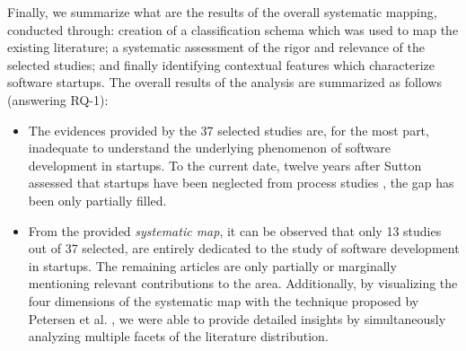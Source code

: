 \documentclass[final,5p,times,twocolumn]{elsarticle}
\begin{document}
Finally, we summarize what are the results of the overall systematic mapping, conducted through: creation of a classification schema which was used to map the existing literature; a systematic assessment of the rigor and relevance of the selected studies; and finally identifying contextual features which characterize software startups. The overall results of the analysis are summarized as follows (answering RQ-1):


\begin{itemize}

\item The evidences provided by the 37 selected studies are, for the most part, inadequate to understand the underlying phenomenon of software development in startups. To the current date, twelve years after Sutton assessed that startups have been neglected from process studies \cite{Sutton2000}, the gap has been only partially filled.
\item From the provided \textit{systematic map}, it can be observed that only 13 studies out of 37 selected, are entirely dedicated to the study of software development in startups. The remaining articles are only partially or marginally mentioning relevant contributions to the area. Additionally, by visualizing the four dimensions of the systematic map with the technique proposed by Petersen et al. \cite{Petersen2007}, we were able to provide detailed insights by simultaneously analyzing multiple facets of the literature distribution.


\end{itemize}
\end{document}
